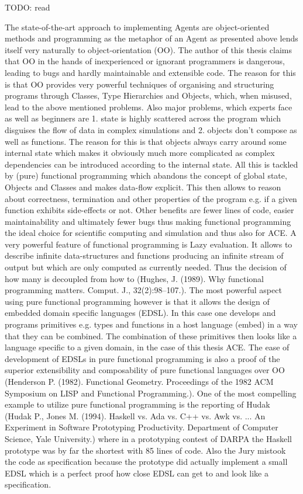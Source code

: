 TODO: read \cite{backus_can_1978}

The state-of-the-art approach to implementing Agents are object-oriented methods and programming as the metaphor of an Agent as presented above lends itself very naturally to object-orientation (OO). The author of this thesis claims that OO in the hands of inexperienced or ignorant programmers is dangerous, leading to bugs and hardly maintainable and extensible code. The reason for this is that OO provides very powerful techniques of organising and structuring programs through Classes, Type Hierarchies and Objects, which, when misused, lead to the above mentioned problems. Also major problems, which experts face as well as beginners are 1. state is highly scattered across the program which disguises the flow of data in complex simulations and 2. objects don’t compose as well as functions. The reason for this is that objects always carry around some internal state which makes it obviously much more complicated as complex dependencies can be introduced according to the internal state.
All this is tackled by (pure) functional programming which abandons the concept of global state, Objects and Classes and makes data-flow explicit. This then allows to reason about correctness, termination and other properties of the program e.g. if a given function exhibits side-effects or not. Other benefits are fewer lines of code, easier maintainability and ultimately fewer bugs thus making functional programming the ideal choice for scientific computing and simulation and thus also for ACE. A very powerful feature of functional programming is Lazy evaluation. It allows to describe infinite data-structures and functions producing an infinite stream of output but which are only computed as currently needed. Thus the decision of how many is decoupled from how to (Hughes, J. (1989). Why functional programming matters. Comput. J., 32(2):98–107.).
The most powerful aspect using pure functional programming however is that it allows the design of embedded domain specific languages (EDSL). In this case one develops and programs primitives e.g. types and functions in a host language (embed) in a way that they can be combined. The combination of these primitives then looks like a language specific to a given domain, in the case of this thesis ACE. The ease of development of EDSLs in pure functional programming is also a proof of the superior extensibility and composability of pure functional languages over OO (Henderson P. (1982). Functional Geometry. Proceedings of the 1982 ACM Symposium on LISP and Functional Programming.).
One of the most compelling example to utilize pure functional programming is the reporting of Hudak (Hudak P., Jones M. (1994). Haskell vs. Ada vs. C++ vs. Awk vs. ... An Experiment in Software Prototyping Productivity. Department of Computer Science, Yale University.)  where in a prototyping contest of DARPA the Haskell prototype was by far the shortest with 85 lines of code. Also the Jury mistook the code as specification because the prototype did actually implement a small EDSL which is a perfect proof how close EDSL can get to and look like a specification.

